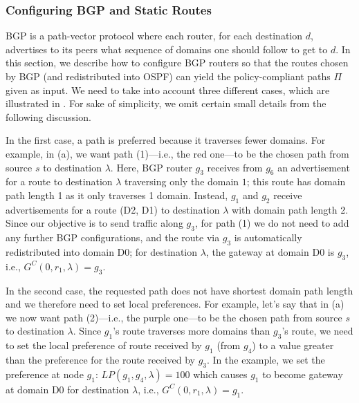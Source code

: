 \subsubsection{Configuring BGP and Static Routes}
BGP is a path-vector protocol where each router,
for each destination $d$,
advertises to its peers
what sequence of domains one should follow to get to  $d$.  
In this section, we describe how to configure
BGP routers so that the routes chosen by BGP (and redistributed into OSPF) 
can yield the policy-compliant
paths $\Pi$ given as input. 
We need to take into account three different
cases, which are illustrated in .  
For sake of simplicity, we omit certain small details from the following discussion.

In the first case, a path is preferred because it traverses fewer domains.
For example, in (a), we want
path (1)---i.e., the red one---to be the chosen path from source $s$ 
to destination $\lambda$.
Here, BGP router $g_3$ receives from $g_6$ an advertisement for a route to destination $\lambda$
traversing only the domain $1$; this route has domain path length 1 as it only traverses 1 domain. 
Instead, $g_1$ and $g_2$ receive advertisements for a route 
(D2, D1)
to destination $\lambda$  with 
domain path length 2. Since our objective is to send traffic along
$g_3$, for path (1) we do not need to add any further BGP configurations,
and the route via $g_3$ is automatically redistributed into domain D0;
for destination $\lambda$, the gateway at domain D0 is $g_3$, i.e.,
$G^C(0, r_1, \lambda) = g_3$.

In the second case, the requested path does not have shortest domain path length
and we therefore need to set local preferences.
For example, let's say that in (a) we now want
path (2)---i.e., the purple one---to be the chosen path from source $s$
to destination $\lambda$. 
Since $g_1$'s route traverses more domains than
 $g_3$'s route,
we need to set the local preference of route received by $g_1$ 
(from $g_4$) to a value greater than the preference for the route received by $g_3$. 
In the example, we set the preference at node $g_1$: 
$LP(g_1, g_4, \lambda) = 100$
which causes $g_1$ to become gateway at domain D0 for destination $\lambda$, i.e., 
$G^C(0, r_1, \lambda) = g_1$.

